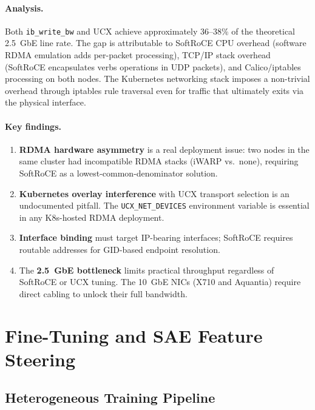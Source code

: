 \documentclass[11pt,letterpaper]{article}
\theoremstyle{definition}
\begin{document}
\paragraph{Analysis.}
Both \texttt{ib\_write\_bw} and UCX achieve approximately 36--38\% of the theoretical 2.5~GbE line rate. The gap is attributable to SoftRoCE CPU overhead (software RDMA emulation adds per-packet processing), TCP/IP stack overhead (SoftRoCE encapsulates verbs operations in UDP packets), and Calico/iptables processing on both nodes. The Kubernetes networking stack imposes a non-trivial overhead through iptables rule traversal even for traffic that ultimately exits via the physical interface.

\paragraph{Key findings.}
\begin{enumerate}
    \item \textbf{RDMA hardware asymmetry} is a real deployment issue: two nodes in the same cluster had incompatible RDMA stacks (iWARP vs.\ none), requiring SoftRoCE as a lowest-common-denominator solution.
    \item \textbf{Kubernetes overlay interference} with UCX transport selection is an undocumented pitfall. The \texttt{UCX\_NET\_DEVICES} environment variable is essential in any K8s-hosted RDMA deployment.
    \item \textbf{Interface binding} must target IP-bearing interfaces; SoftRoCE requires routable addresses for GID-based endpoint resolution.
    \item The \textbf{2.5~GbE bottleneck} limits practical throughput regardless of SoftRoCE or UCX tuning. The 10~GbE NICs (X710 and Aquantia) require direct cabling to unlock their full bandwidth.
\end{enumerate}

\section{Fine-Tuning and SAE Feature Steering}
\label{sec:finetuning-sae}

\subsection{Heterogeneous Training Pipeline}
\end{document}
